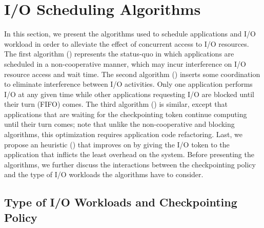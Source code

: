 \section{I/O Scheduling Algorithms}\label{sec:algorithms}


In this section, we present the algorithms used to schedule applications
and I/O workload in order to alleviate the effect of concurrent access
to I/O resources. The first algorithm (\nocoop) represents the status-quo
in which applications are scheduled in a non-cooperative manner, which may
incur interference on I/O resource access and wait time. The second
algorithm (\fifoblock) inserts some coordination to eliminate interference
between I/O activities. Only one application performs I/O at any given
time while other applications requesting I/O are blocked until their
turn (FIFO) comes. The third algorithm (\fifononblock) is similar, except
that applications that are waiting for the checkpointing token
continue computing until their turn comes; note that unlike the
non-cooperative and blocking algorithms, this optimization requires
application code refactoring. Last, we propose an heuristic
(\leastwaste) that improves on \fifononblock by giving the I/O token
to the application that inflicts the least overhead on the system. Before
presenting the algorithms, we further discuss the interactions between
the checkpointing policy and the type of I/O workloads the algorithms
have to consider.


\subsection{Type of I/O Workloads and Checkpointing Policy}

